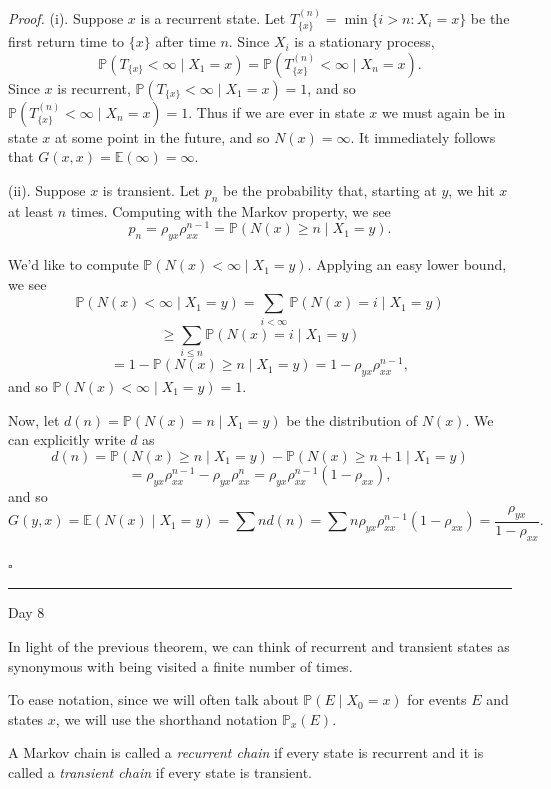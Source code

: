 \documentclass{problemset}
\newcommand{\E}{\mathbb{E}}
\renewcommand{\P}{\mathbb{P}}
\newcommand{\fatrule}[1]{\vspace{.3cm}\hrule {\hfill \sf #1}\par}
\newenvironment{proof}{\emph{Proof.}}{\hfill$\square$}
\begin{document}
	\begin{proof}
		(i).  Suppose $x$ is a recurrent state.  Let $T^{(n)}_{\{x\}}= \min\{i > n:X_i=x\}$
		be the first return time to $\{x\}$ after time $n$.
		Since $X_i$ is a stationary process,
		\[
			\P(T_{\{x\}} < \infty\mid X_1=x) = \P(T^{(n)}_{\{x\}} < \infty\mid X_n=x).
		\]
		Since $x$ is recurrent, $\P(T_{\{x\}} < \infty\mid X_1=x)=1$, and so
		$\P(T^{(n)}_{\{x\}} < \infty\mid X_n=x)=1$.  Thus if we are ever in state
		$x$ we must again be in state $x$ at some point in the future, and so $N(x)=\infty$.
		It immediately follows that $G(x,x) = \E(\infty) =\infty$.
		
		(ii). Suppose $x$ is transient. 
		Let $p_n$ be the probability that, starting at $y$, we hit $x$ at least $n$ times.  Computing
		with the Markov property, we see
		\[
			p_n = \rho_{yx}\rho_{xx}^{n-1}=\P(N(x)\geq n \mid X_1=y).
		\]

		We'd like to compute $\P(N(x) < \infty\mid X_1=y)$.  Applying an easy lower bound,
		we see
		\[
			\P(N(x) < \infty\mid X_1=y) = \sum_{i<\infty} \P(N(x) = i \mid X_1=y)
		\]\[
			\geq \sum_{i\leq n} \P(N(x) = i \mid X_1=y) 
		\]\[
			= 1-\P(N(x)\geq n \mid X_1=y) = 1-\rho_{yx}\rho_{xx}^{n-1},
		\]
		and so $\P(N(x) < \infty\mid X_1=y)=1$.

		Now, let $d(n) = \P(N(x) =n \mid X_1=y)$ be the distribution of $N(x)$.
		We can explicitly write $d$ as 
		\[
			d(n) = \P(N(x) \geq n \mid X_1=y) - \P(N(x) \geq n+1 \mid X_1=y)
		\]\[
			= \rho_{yx}\rho_{xx}^{n-1} - \rho_{yx}\rho_{xx}^{n} = \rho_{yx}\rho_{xx}^{n-1}(1-\rho_{xx}),
		\]
		and so
		\[
			G(y,x) = \E(N(x) \mid X_1=y) = \sum nd(n) = \sum n\rho_{yx}\rho_{xx}^{n-1}(1-\rho_{xx})
			=\frac{\rho_{yx}}{1-\rho_{xx}}.
		\]

	\end{proof}

	\fatrule{Day 8}

	In light of the previous theorem, we can think of recurrent and transient states as synonymous with
	being visited a finite number of times.

	To ease notation, since we will often 
	talk about $\P(E\mid X_0=x)$ for events $E$ and states $x$, we will use the shorthand notation $\P_x(E)$.

	\begin{definition}
		A Markov chain is called a \emph{recurrent chain} if every state is recurrent and
		it is called a \emph{transient chain} if every state is transient.
	\end{definition}
\end{document}
